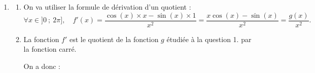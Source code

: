 \documentclass[10pt]{article}
\begin{document}
\begin{enumerate}
\begin{enumerate}
\begin{center}
\end{center}

\item La fonction $g$ est continue (car dérivable) sur $[\pi~;~2\pi]$, sur cet intervalle, elle est strictement croissante.

De plus, 0 est une valeur intermédiaire entre $f(\pi)=-\pi$ et $f(2\pi)=2\pi$.

D'après le corollaire du théorème des valeurs intermédiaires, il existe donc une unique solution à l'équation $g(x)=0$ dans l'intervalle $[0~;~2\pi]$, solution que l'on note $\alpha$.

\item On peut étoffer le tableau de variations précédent avec $\alpha$


\begin{center}
\end{center}

Sur $[0~;~\alpha]$, la fonction $g$ est donc à valeurs négatives, puis sur $[\alpha~;~2\pi]$, elle est  à valeurs positives.


\end{enumerate}

\item \begin{enumerate}
\item On va utiliser la formule de dérivation d'un quotient :
\[
\forall x\in ]0~;~2\pi],\quad f'(x)=\dfrac{\cos(x)\times x-\sin(x)\times 1}{x^2}=\dfrac{x\cos(x)-\sin(x)}{x^2}=\dfrac{g(x)}{x^2}.
\]

\item La fonction $f'$ est le quotient de la fonction $g$ étudiée à la question 1. par la fonction carré.

On a donc :

\begin{center}
\end{center}
\end{enumerate}
\end{enumerate}
\end{document}
